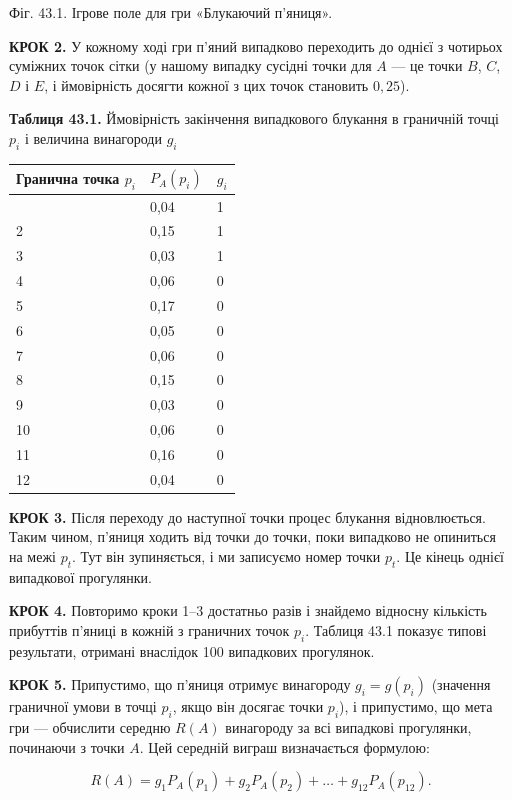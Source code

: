 \documentclass[
  ukrainian,
]{article}
\newcounter{none} %
\begin{document}
Фіг. 43.1. Ігрове поле для гри «Блукаючий п'яниця».

\textbf{КРОК 2.} У кожному ході гри п'яний випадково переходить до
однієї з чотирьох суміжних точок сітки (у нашому випадку сусідні точки
для \(A\) --- це точки \(B\), \(C\), \(D\) і \(E\), і ймовірність
досягти кожної з цих точок становить \(0{,}25\)).

\textbf{Таблиця 43.1.} Ймовірність закінчення випадкового блукання в
граничній точці \(p_i\) і величина винагороди \(g_i\)

{\def\LTcaptype{none} %
\begin{longtable}[]{@{}lll@{}}
\toprule\noalign{}
Гранична точка \(p_i\) & \(P_A(p_i)\) & \(g_i\) \\
\midrule\noalign{}
\endhead
\bottomrule\noalign{}
\endlastfoot
1 & 0,04 & 1 \\
2 & 0,15 & 1 \\
3 & 0,03 & 1 \\
4 & 0,06 & 0 \\
5 & 0,17 & 0 \\
6 & 0,05 & 0 \\
7 & 0,06 & 0 \\
8 & 0,15 & 0 \\
9 & 0,03 & 0 \\
10 & 0,06 & 0 \\
11 & 0,16 & 0 \\
12 & 0,04 & 0 \\
\end{longtable}
}

\textbf{КРОК 3.} Після переходу до наступної точки процес блукання
відновлюється. Таким чином, п'яниця ходить від точки до точки, поки
випадково не опиниться на межі \(p_t\). Тут він зупиняється, і ми
записуємо номер точки \(p_t\). Це кінець однієї випадкової прогулянки.

\textbf{КРОК 4.} Повторимо кроки 1--3 достатньо разів і знайдемо
відносну кількість прибуттів п'яниці в кожній з граничних точок \(p_i\).
Таблиця 43.1 показує типові результати, отримані внаслідок 100
випадкових прогулянок.

\textbf{КРОК 5.} Припустимо, що п'яниця отримує винагороду
\(g_i = g(p_i)\) (значення граничної умови в точці \(p_i\), якщо він
досягає точки \(p_i\)), і припустимо, що мета гри --- обчислити середню
\(R(A)\) винагороду за всі випадкові прогулянки, починаючи з точки
\(A\). Цей середній виграш визначається формулою:

\[R(A) = g_1 P_A(p_1) + g_2 P_A(p_2) + \dots + g_{12} P_A(p_{12}).\]
\end{document}
